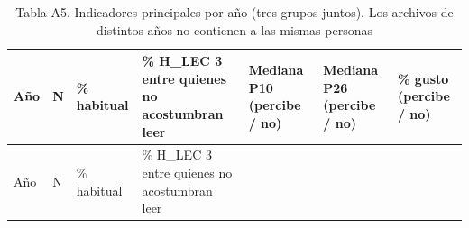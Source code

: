 \documentclass[
  spanish,
  12pt,
]{extarticle}
\begin{document}
\begin{longtable}[]{@{}
  >{\raggedleft\arraybackslash}p{}
  >{\raggedleft\arraybackslash}p{}
  >{\raggedleft\arraybackslash}p{}
  >{\raggedleft\arraybackslash}p{}
  >{\raggedright\arraybackslash}p{}
  >{\raggedright\arraybackslash}p{}
  >{\raggedright\arraybackslash}p{}@{}}
\caption{Tabla A5. Indicadores principales por año (tres grupos juntos).
Los archivos de distintos años no contienen a las mismas
personas}\tabularnewline
\toprule\noalign{}
\begin{minipage}[b]{\linewidth}\raggedleft
Año
\end{minipage} & \begin{minipage}[b]{\linewidth}\raggedleft
N
\end{minipage} & \begin{minipage}[b]{\linewidth}\raggedleft
\% habitual
\end{minipage} & \begin{minipage}[b]{\linewidth}\raggedleft
\% H\_LEC 3 entre quienes no acostumbran leer
\end{minipage} & \begin{minipage}[b]{\linewidth}\raggedright
Mediana P10 (percibe / no)
\end{minipage} & \begin{minipage}[b]{\linewidth}\raggedright
Mediana P26 (percibe / no)
\end{minipage} & \begin{minipage}[b]{\linewidth}\raggedright
\% gusto (percibe / no)
\end{minipage} \\
\midrule\noalign{}
\endfirsthead
\toprule\noalign{}
\begin{minipage}[b]{\linewidth}\raggedleft
Año
\end{minipage} & \begin{minipage}[b]{\linewidth}\raggedleft
N
\end{minipage} & \begin{minipage}[b]{\linewidth}\raggedleft
\% habitual
\end{minipage} & \begin{minipage}[b]{\linewidth}\raggedleft
\% H\_LEC 3 entre quienes no acostumbran leer
\end{minipage} & \begin{minipage}[b]{\linewidth}\raggedright

\end{minipage}
\end{longtable}
\end{document}
